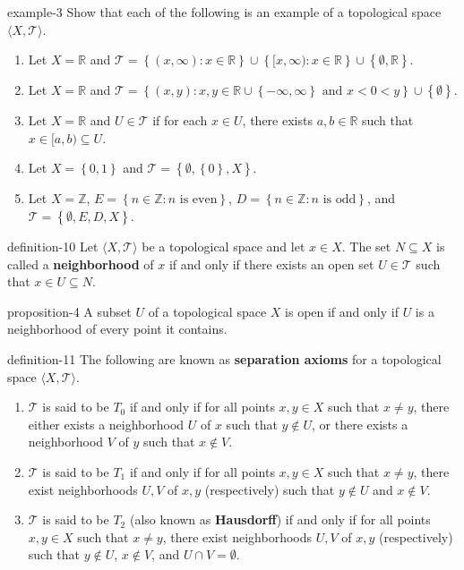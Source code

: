 \documentclass[10pt,]{article}
\newcommand{\terminology}[1]{\textbf{#1}}
\newcommand{\tuple}[1]{\langle #1 \rangle}
\newcommand{\mb}{\mathbb}
\newcommand{\mc}{\mathcal}
\newcommand{\setBuilder}[2]{\left\{#1:#2\right\}}
\newcommand{\setList}[1]{\left\{#1\right\}}
\newcommand{\lt}{<}
\begin{document}
\begin{example}{}{example-3}%
\hypertarget{p-35}{}%
Show that each of the following is an example of a topological space \(\tuple{X,\mc T}\).%
\leavevmode%
\begin{enumerate}
\item\hypertarget{li-23}{}Let \(X=\mb R\) and \(\mc T=\setBuilder{(x,\infty)}{x\in\mb R}
\cup\setBuilder{[x,\infty)}{x\in\mb R}\cup\setList{\emptyset,\mb R}\).%
\item\hypertarget{li-24}{}Let \(X=\mb R\) and \(\mc T=\setBuilder{(x,y)}{
x,y\in\mb R\cup\setList{-\infty,\infty} \text{ and }x\lt 0\lt y
}\cup\setList{\emptyset}\).%
\item\hypertarget{li-25}{}Let \(X=\mb R\) and \(U\in\mc T\) if for each \(x\in U\), there exists \(a,b\in\mb R\) such that \(x\in[a,b)\subseteq U\).%
\item\hypertarget{li-26}{}Let \(X=\setList{0,1}\) and \(\mc T=\setList{\emptyset,\setList{0},X}\).%
\item\hypertarget{li-27}{}Let \(X=\mb Z\), \(E=\setBuilder{n\in\mb Z}{n\text{ is even}}\), \(D=\setBuilder{n\in\mb Z}{n\text{ is odd}}\), and \(\mc T=\setList{\emptyset,E,D,X}\).%
\end{enumerate}
\end{example}
\begin{definition}{}{definition-10}%
\hypertarget{p-36}{}%
Let \(\tuple{X,\mc T}\) be a topological space and let \(x\in X\). The set \(N\subseteq X\) is called a \terminology{neighborhood} of \(x\) if and only if there exists an open set \(U\in\mc T\) such that \(x\in U\subseteq N\).%
\end{definition}
\begin{proposition}{}{}{proposition-4}%
\hypertarget{p-37}{}%
A subset \(U\) of a topological space \(X\) is open if and only if \(U\) is a neighborhood of every point it contains.%
\end{proposition}
\begin{definition}{}{definition-11}%
\hypertarget{p-38}{}%
The following are known as \terminology{separation axioms} for a topological space \(\tuple{X,\mc T}\).%
\leavevmode%
\begin{enumerate}
\item\hypertarget{li-28}{}\(\mc T\) is said to be \terminology{\(T_0\)} if and only if for all points \(x,y\in X\) such that \(x\not=y\), there either exists a neighborhood \(U\) of \(x\) such that \(y\not\in U\), or there exists a neighborhood \(V\) of \(y\) such that \(x\not\in V\).%
\item\hypertarget{li-29}{}\(\mc T\) is said to be \terminology{\(T_1\)} if and only if for all points \(x,y\in X\) such that \(x\not=y\), there exist neighborhoods \(U,V\) of \(x,y\) (respectively) such that \(y\not\in U\) and \(x\not\in V\).%
\item\hypertarget{li-30}{}\(\mc T\) is said to be \terminology{\(T_2\)} (also known as \terminology{Hausdorff}) if and only if for all points \(x,y\in X\) such that \(x\not=y\), there exist neighborhoods \(U,V\) of \(x,y\) (respectively) such that \(y\not\in U\), \(x\not\in V\), and \(U\cap V=\emptyset\).%
\end{enumerate}
\end{definition}
\end{document}
